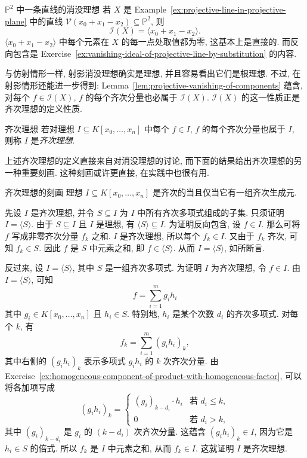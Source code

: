 \begin{Example}{$\mathbb{P}^{2}$ 中一条直线的消没理想}\leavevmode\label{ex:vanishing-ideal-of-projective-line-in-plane}
若 $X$ 是 Example~\ref{ex:projective-line-in-projective-plane} 中的直线 $\mathcal{V}(x_{0}+x_{1}-x_{2})\subseteq\mathbb{P}^{2}$, 则
\[
  \mathcal{I}(X)=\langle x_{0}+x_{1}-x_{2}\rangle.
\]
$\langle x_{0}+x_{1}-x_{2}\rangle$ 中每个元素在 $X$ 的每一点处取值都为零, 这基本上是直接的. 而反向包含是 Exercise~\ref{ex:vanishing-ideal-of-projective-line-by-substitution} 的内容.
\end{Example}

与仿射情形一样, 射影消没理想确实是理想, 并且容易看出它们是根理想. 不过, 在射影情形还能进一步得到: Lemma~\ref{lem:projective-vanishing-of-components} 蕴含, 对每个 $f\in\mathcal{I}(X)$, $f$ 的每个齐次分量也必属于 $\mathcal{I}(X)$. $\mathcal{I}(X)$ 的这一性质正是齐次理想的定义性质.

\begin{Definition}{齐次理想}\leavevmode\label{def:homogeneous-ideal}
若对理想 $I\subseteq K[x_{0},\ldots,x_{n}]$ 中每个 $f\in I$, $f$ 的每个齐次分量也属于 $I$, 则称 $I$ 是\emph{齐次理想}.
\end{Definition}

上述齐次理想的定义直接来自对消没理想的讨论, 而下面的结果给出齐次理想的另一种重要刻画. 这种刻画或许更直接, 在实践中也很有用.

\begin{Proposition}{齐次理想的刻画}\leavevmode\label{prop:homogeneous-ideal-has-homogeneous-generators}
理想 $I\subseteq K[x_{0},\ldots,x_{n}]$ 是齐次的当且仅当它有一组齐次生成元.
\end{Proposition}
\begin{Proof}
先设 $I$ 是齐次理想, 并令 $S\subseteq I$ 为 $I$ 中所有齐次多项式组成的子集. 只须证明 $I=\langle S\rangle$. 由于 $S\subseteq I$ 且 $I$ 是理想, 有 $\langle S\rangle\subseteq I$. 为证明反向包含, 设 $f\in I$. 那么可将 $f$ 写成非零齐次分量 $f_{k}$ 之和. $I$ 是齐次理想, 所以每个 $f_{k}\in I$. 又由于 $f_{k}$ 齐次, 可知 $f_{k}\in S$. 因此 $f$ 是 $S$ 中元素之和, 即 $f\in\langle S\rangle$. 从而 $I=\langle S\rangle$, 如所断言.

反过来, 设 $I=\langle S\rangle$, 其中 $S$ 是一组齐次多项式. 为证明 $I$ 为齐次理想, 令 $f\in I$. 由 $I=\langle S\rangle$, 可知
\[
  f=\sum_{i=1}^{m}g_{i}h_{i}
\]
其中 $g_{i}\in K[x_{0},\ldots,x_{n}]$ 且 $h_{i}\in S$. 特别地, $h_{i}$ 是某个次数 $d_{i}$ 的齐次多项式. 对每个 $k$, 有
\[
  f_{k}=\sum_{i=1}^{m}(g_{i}h_{i})_{k},
\]
其中右侧的 $(g_{i}h_{i})_{k}$ 表示多项式 $g_{i}h_{i}$ 的 $k$ 次齐次分量. 由 Exercise~\ref{ex:homogeneous-component-of-product-with-homogeneous-factor}, 可以将各加项写成
\[
  (g_{i}h_{i})_{k}=
  \begin{cases}
    (g_{i})_{k-d_{i}}\cdot h_{i} & \text{若 }d_{i}\leq k,\\
    0 & \text{若 }d_{i}>k,
  \end{cases}
\]
其中 $(g_{i})_{k-d_{i}}$ 是 $g_{i}$ 的 $(k-d_{i})$ 次齐次分量. 这蕴含 $(g_{i}h_{i})_{k}\in I$, 因为它是 $h_{i}\in S$ 的倍式. 所以 $f_{k}$ 是 $I$ 中元素之和, 从而 $f_{k}\in I$. 这就证明 $I$ 是齐次理想.
\end{Proof}


